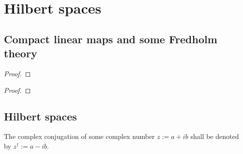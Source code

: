 \section{Hilbert spaces} \label{section: hilbert_spaces}
    \subsection{Compact linear maps and some Fredholm theory}
        \begin{proposition} \label{prop: compact_linear_maps}
        \end{proposition}
            \begin{proof}
                
            \end{proof}

        \begin{proposition} \label{prop: weakly_bounded_sequences}
        \end{proposition}
            \begin{proof}
                
            \end{proof}

    \subsection{Hilbert spaces}
        \begin{convention}
            The complex conjugation of some complex number $z := a + ib$ shall be denoted by $z^{\dagger} := a - ib$.
        \end{convention}
    
